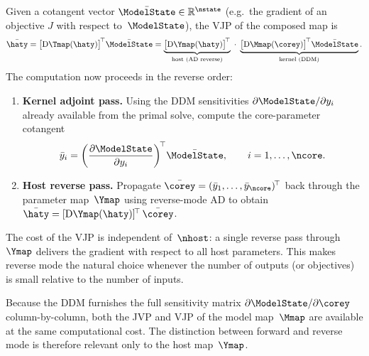 Given a cotangent vector $\bar{\ModelState} \in \mathbb{R}^{\nstate}$
(e.g.\ the gradient of an objective $J$ with respect to~$\ModelState$),
the VJP of the composed map is
\begin{equation}\label{eq:vjp}
    \bar{\haty}
    = \bigl[\mathrm{D}\Tmap(\haty)\bigr]^{\!\top} \bar{\ModelState}
    = \underbrace{%
        \bigl[\mathrm{D}\Ymap(\haty)\bigr]^{\!\top}
      }_{\text{host (AD reverse)}}
      \;\cdot\;
      \underbrace{%
        \bigl[\mathrm{D}\Mmap(\corey)\bigr]^{\!\top} \bar{\ModelState}
      }_{\text{kernel (DDM)}}.
\end{equation}
The computation now proceeds in the reverse order:
\begin{enumerate}
    \item \textbf{Kernel adjoint pass.}  Using the DDM sensitivities
          $\partial\ModelState/\partial y_i$ already available from the
          primal solve, compute the core-parameter cotangent
          \begin{equation}\label{eq:vjp-kernel}
              \bar{y}_i
              = \biggl(\frac{\partial\ModelState}{\partial y_i}\biggr)^{\!\top}
                \bar{\ModelState},
              \qquad i = 1,\ldots,\ncore.
          \end{equation}
    \item \textbf{Host reverse pass.}  Propagate
          $\bar{\corey} = (\bar{y}_1,\ldots,\bar{y}_{\ncore})^{\!\top}$
          back through the parameter map~$\Ymap$ using reverse-mode
          AD to obtain
          $\bar{\haty} = [\mathrm{D}\Ymap(\haty)]^{\!\top}\,\bar{\corey}$.
\end{enumerate}

The cost of the VJP is independent of~$\nhost$: a single reverse pass
through~$\Ymap$ delivers the gradient with respect to all host
parameters.  This makes reverse mode the natural choice whenever the
number of outputs (or objectives) is small relative to the number of
inputs.

\begin{remark}
    Because the DDM furnishes the full sensitivity matrix
    $\partial\ModelState/\partial\corey$ column-by-column, both the JVP
    and VJP of the model map~$\Mmap$ are available at the same
    computational cost.  The distinction between forward and reverse
    mode is therefore relevant only to the host map~$\Ymap$.
\end{remark}





